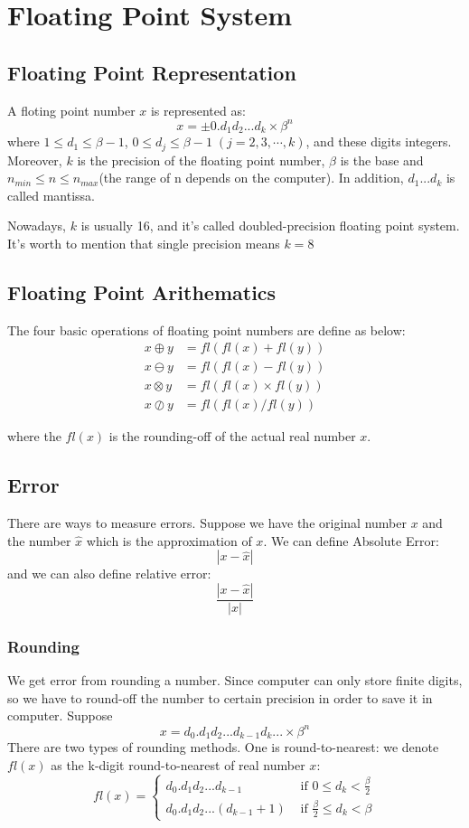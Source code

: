 	\newtheorem*{upperbound}{Theorem}
	\chapter{Floating Point System}
	\section{Floating Point Representation}
	A floting point number $x$ is represented as:
	\[x = \pm 0.d_1d_2...d_k\times\beta^n\]
	where $1\leq d_1\leq \beta-1$, $0\leq d_j\leq \beta-1\;(j=2,3,\cdots,k)$, and these digits integers. Moreover, $k$ is the precision of the floating point number, $\beta$ is the base and $n_{min} \leq n\leq n_{max}$(the range of n depends on the computer).
	In addition, $d_1...d_k$ is called mantissa.
	
	Nowadays, $k$ is usually 16, and it's called doubled-precision floating point system. It's worth to mention that single precision means $k=8$ 
	
	\section{Floating Point Arithematics}
	The four basic operations of floating point numbers are define as below:
	\begin{align*}
		x\oplus y &= fl(fl(x)+fl(y))\\
		x\ominus y &= fl(fl(x)-fl(y))\\
		x\otimes y &= fl(fl(x)\times fl(y))\\
		x\oslash y &= fl(fl(x)/fl(y))
	\end{align*}

	where the $fl(x)$ is the rounding-off of the actual real number $x$.
	
	\section{Error}
	There are ways to measure errors. Suppose we have the original number $x$ and the number $\hat{x}$ which is the approximation of $x$. We can define Absolute Error:
	\[|x - \hat{x}|\]
	and we can also define relative error:
	\[\frac{|x-\hat{x}|}{|x|}\] 
	
	\subsection{Rounding}
	We get error from rounding a number. Since computer can only store finite digits, so we have to round-off the number to certain precision in order to save it in computer.
	Suppose 
	\[x = d_0.d_1d_2...d_{k-1}d_k... \times \beta^n \]
	There are two types of rounding methods. One is round-to-nearest: we denote $fl(x)$ as the k-digit round-to-nearest of real number $x$:
	\begin{displaymath}
	fl(x) = 
	\begin{cases}
	d_0.d_1d_2...d_{k-1} & \text{ if } 0 \leq d_{k}<\frac{\beta}{2} \\ 
	d_0.d_1d_2...(d_{k-1}+1) & \text{ if } \frac{\beta}{2} \leq d_{k} < \beta
	\end{cases}
	\end{displaymath}
	
